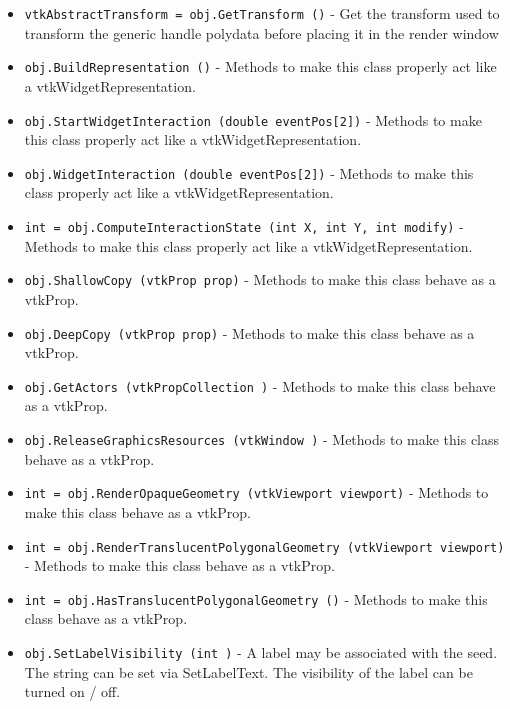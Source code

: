 \begin{itemize}
\item  \verb|vtkAbstractTransform = obj.GetTransform ()| -  Get the transform used to transform the generic handle polydata before
 placing it in the render window

\item  \verb|obj.BuildRepresentation ()| -  Methods to make this class properly act like a vtkWidgetRepresentation.

\item  \verb|obj.StartWidgetInteraction (double eventPos[2])| -  Methods to make this class properly act like a vtkWidgetRepresentation.

\item  \verb|obj.WidgetInteraction (double eventPos[2])| -  Methods to make this class properly act like a vtkWidgetRepresentation.

\item  \verb|int = obj.ComputeInteractionState (int X, int Y, int modify)| -  Methods to make this class properly act like a vtkWidgetRepresentation.

\item  \verb|obj.ShallowCopy (vtkProp prop)| -  Methods to make this class behave as a vtkProp.

\item  \verb|obj.DeepCopy (vtkProp prop)| -  Methods to make this class behave as a vtkProp.

\item  \verb|obj.GetActors (vtkPropCollection )| -  Methods to make this class behave as a vtkProp.

\item  \verb|obj.ReleaseGraphicsResources (vtkWindow )| -  Methods to make this class behave as a vtkProp.

\item  \verb|int = obj.RenderOpaqueGeometry (vtkViewport viewport)| -  Methods to make this class behave as a vtkProp.

\item  \verb|int = obj.RenderTranslucentPolygonalGeometry (vtkViewport viewport)| -  Methods to make this class behave as a vtkProp.

\item  \verb|int = obj.HasTranslucentPolygonalGeometry ()| -  Methods to make this class behave as a vtkProp.

\item  \verb|obj.SetLabelVisibility (int )| -  A label may be associated with the seed. The string can be set via
 SetLabelText. The visibility of the label can be turned on / off.


\end{itemize}
